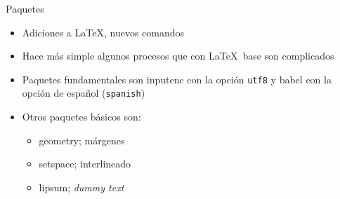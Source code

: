 \documentclass{beamer}
\begin{document}
\begin{frame}{Paquetes}
\begin{itemize}
    \item Adiciones a \LaTeX, nuevos comandos 
    \item Hace más simple algunos procesos que con \LaTeX\ base son complicados
    \item Paquetes fundamentales son \textsf{inputenc} con la opción \texttt{utf8} y \textsf{babel} con la opción de español (\texttt{spanish})
    \item Otros paquetes básicos son: 
    \begin{itemize}
        \item \textsf{geometry}; márgenes
        \item \textsf{setspace}; interlineado
        \item \textsf{lipsum}; \textit{dummy text}
            \end{itemize}
    
 \end{itemize}
    \end{frame}
\end{document}
